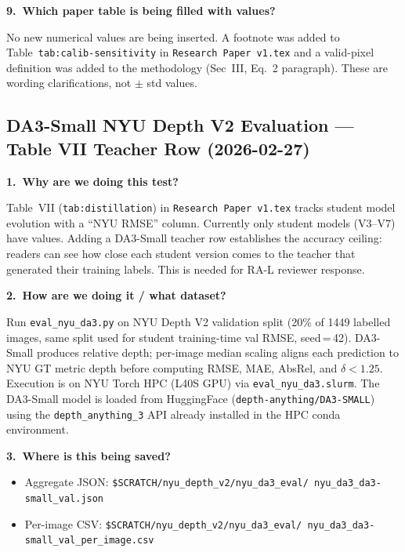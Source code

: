 \documentclass[11pt,a4paper]{article}
\begin{document}
\textbf{9.\ Which paper table is being filled with values?}

No new numerical values are being inserted. A footnote was added to
Table~\texttt{tab:calib-sensitivity} in \texttt{Research Paper v1.tex}
and a valid-pixel definition was added to the methodology
(Sec~III, Eq.~2 paragraph). These are wording clarifications, not
$\pm$ std values.


\subsection*{DA3-Small NYU Depth V2 Evaluation — Table VII Teacher Row
  (2026-02-27)}

\textbf{1.\ Why are we doing this test?}

Table~VII (\texttt{tab:distillation}) in \texttt{Research Paper v1.tex}
tracks student model evolution with a ``NYU RMSE'' column.  Currently
only student models (V3--V7) have values.  Adding a DA3-Small teacher
row establishes the accuracy ceiling: readers can see how close each
student version comes to the teacher that generated their training
labels.  This is needed for RA-L reviewer response.

\textbf{2.\ How are we doing it / what dataset?}

Run \texttt{eval\_nyu\_da3.py} on NYU Depth V2 validation split
(20\% of 1449 labelled images, same split used for student
training-time val RMSE, seed\,=\,42).  DA3-Small produces relative
depth; per-image median scaling aligns each prediction to NYU GT
metric depth before computing RMSE, MAE, AbsRel, and $\delta<1.25$.
Execution is on NYU Torch HPC (L40S GPU) via
\texttt{eval\_nyu\_da3.slurm}.  The DA3-Small model is loaded from
HuggingFace (\texttt{depth-anything/DA3-SMALL}) using the
\texttt{depth\_anything\_3} API already installed in the HPC conda
environment.

\textbf{3.\ Where is this being saved?}

\begin{itemize}
  \item Aggregate JSON:
    \texttt{\$SCRATCH/nyu\_depth\_v2/nyu\_da3\_eval/%
      nyu\_da3\_da3-small\_val.json}
  \item Per-image CSV:
    \texttt{\$SCRATCH/nyu\_depth\_v2/nyu\_da3\_eval/%
      nyu\_da3\_da3-small\_val\_per\_image.csv}
\end{itemize}
\end{document}
